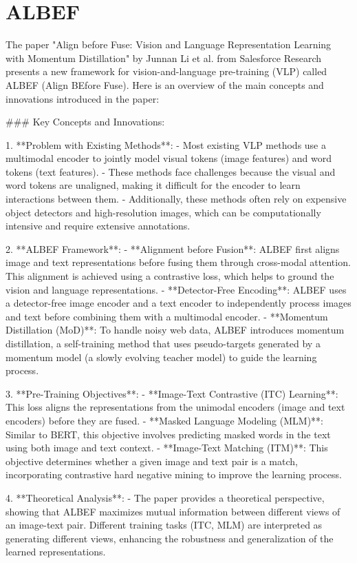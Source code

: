 \section{ALBEF}
The paper "Align before Fuse: Vision and Language Representation Learning with Momentum Distillation" by Junnan Li et al. from Salesforce Research presents a new framework for vision-and-language pre-training (VLP) called ALBEF (Align BEfore Fuse). Here is an overview of the main concepts and innovations introduced in the paper:

### Key Concepts and Innovations:

1. **Problem with Existing Methods**:
   - Most existing VLP methods use a multimodal encoder to jointly model visual tokens (image features) and word tokens (text features).
   - These methods face challenges because the visual and word tokens are unaligned, making it difficult for the encoder to learn interactions between them.
   - Additionally, these methods often rely on expensive object detectors and high-resolution images, which can be computationally intensive and require extensive annotations.

2. **ALBEF Framework**:
   - **Alignment before Fusion**: ALBEF first aligns image and text representations before fusing them through cross-modal attention. This alignment is achieved using a contrastive loss, which helps to ground the vision and language representations.
   - **Detector-Free Encoding**: ALBEF uses a detector-free image encoder and a text encoder to independently process images and text before combining them with a multimodal encoder.
   - **Momentum Distillation (MoD)**: To handle noisy web data, ALBEF introduces momentum distillation, a self-training method that uses pseudo-targets generated by a momentum model (a slowly evolving teacher model) to guide the learning process.

3. **Pre-Training Objectives**:
   - **Image-Text Contrastive (ITC) Learning**: This loss aligns the representations from the unimodal encoders (image and text encoders) before they are fused.
   - **Masked Language Modeling (MLM)**: Similar to BERT, this objective involves predicting masked words in the text using both image and text context.
   - **Image-Text Matching (ITM)**: This objective determines whether a given image and text pair is a match, incorporating contrastive hard negative mining to improve the learning process.

4. **Theoretical Analysis**:
   - The paper provides a theoretical perspective, showing that ALBEF maximizes mutual information between different views of an image-text pair. Different training tasks (ITC, MLM) are interpreted as generating different views, enhancing the robustness and generalization of the learned representations.

